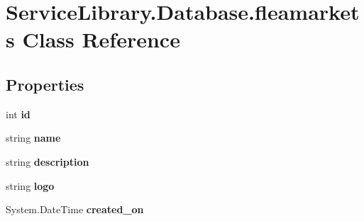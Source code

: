 \hypertarget{class_service_library_1_1_database_1_1fleamarkets}{\section{Service\-Library.\-Database.\-fleamarkets Class Reference}
\label{class_service_library_1_1_database_1_1fleamarkets}
}
\subsection*{Properties}
\begin{DoxyCompactItemize}
\item 
\hypertarget{class_service_library_1_1_database_1_1fleamarkets_a79402a398f6201e1fdef2e793bd0e908}{int {\bfseries id}}\label{class_service_library_1_1_database_1_1fleamarkets_a79402a398f6201e1fdef2e793bd0e908}

\item 
\hypertarget{class_service_library_1_1_database_1_1fleamarkets_af75b9ced1933c6851dd7492be767f022}{string {\bfseries name}}\label{class_service_library_1_1_database_1_1fleamarkets_af75b9ced1933c6851dd7492be767f022}

\item 
\hypertarget{class_service_library_1_1_database_1_1fleamarkets_ae3b43e66b8e4b6c186d390eef4c53852}{string {\bfseries description}}\label{class_service_library_1_1_database_1_1fleamarkets_ae3b43e66b8e4b6c186d390eef4c53852}

\item 
\hypertarget{class_service_library_1_1_database_1_1fleamarkets_a9b484467c018f0edc249b520962b29a0}{string {\bfseries logo}}\label{class_service_library_1_1_database_1_1fleamarkets_a9b484467c018f0edc249b520962b29a0}

\item 
\hypertarget{class_service_library_1_1_database_1_1fleamarkets_a7620eaed0bd301443a852956d454fe8f}{System.\-Date\-Time {\bfseries created\-\_\-on}}\label{class_service_library_1_1_database_1_1fleamarkets_a7620eaed0bd301443a852956d454fe8f}


\end{DoxyCompactItemize}
